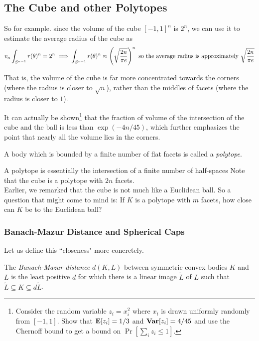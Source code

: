 \subsection{The Cube and other Polytopes}

So for example. since the volume of the cube $[-1,1]^n$ is $2^n$, we can use it to estimate the average radius of the cube as
\[
v_n\int_{S^{n-1}} r(\theta)^n = 2^n \implies \int_{S^{n-1}} r(\theta)^n \approx \left(\sqrt{\frac{{2n}}{\pi e}}\right)^n \\
\text{ so the average radius is approximately }\sqrt\frac{2n}{\pi e}
\]

That is, the volume of the cube is far more concentrated towards the corners (where the radius is closer to $\sqrt n$), rather than the middles of facets (where the radius is closer to $1$).

It can actually be shown\footnote{Consider the random variable $z_i=x_i^2$ where $x_i$ is drawn uniformly randomly from $[-1,1]$. Show that $\textbf{E}[z_i]=1/3$ and $\operatorname{\textbf{Var}}[z_i]=4/45$ and use the Chernoff bound to get a bound on $\Pr[\sum_i z_i\leq 1]$.} that the fraction of volume of the intersection of the cube and the ball is less than $\exp(-4n/45)$, which further emphasizes the point that nearly all the volume lies in the corners.

\begin{definition}
\label{def: polytope}
A body which is bounded by a finite number of flat facets is called a \textit{polytope}.
\end{definition}

A polytope is essentially the intersection of a finite number of half-spaces 
Note that the cube is a polytope with $2n$ facets.\\

Earlier, we remarked that the cube is not much like a Euclidean ball. So a question that might come to mind is: If $K$ is a polytope with $m$ facets, how close can $K$ be to the Euclidean ball?

\subsubsection{Banach-Mazur Distance and Spherical Caps}

Let us define this ``closeness" more concretely.

\begin{fdef}
The \textit{Banach-Mazur distance} $d(K,L)$ between symmetric convex bodies $K$ and $L$ is the least positive $d$ for which there is a linear image $\tilde L$ of $L$ such that $\tilde L\subseteq K\subseteq d\tilde L$.
\end{fdef}

